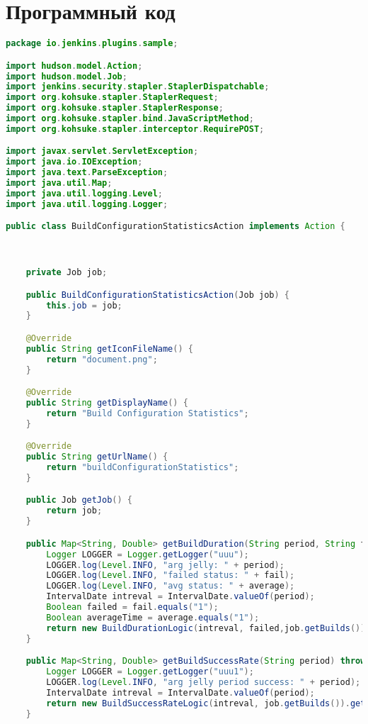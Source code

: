 \chapter{Программный код}\label{appendix-extra-examples}

\begin{lstlisting}[language=Java]
package io.jenkins.plugins.sample;

import hudson.model.Action;
import hudson.model.Job;
import jenkins.security.stapler.StaplerDispatchable;
import org.kohsuke.stapler.StaplerRequest;
import org.kohsuke.stapler.StaplerResponse;
import org.kohsuke.stapler.bind.JavaScriptMethod;
import org.kohsuke.stapler.interceptor.RequirePOST;

import javax.servlet.ServletException;
import java.io.IOException;
import java.text.ParseException;
import java.util.Map;
import java.util.logging.Level;
import java.util.logging.Logger;

public class BuildConfigurationStatisticsAction implements Action {



    private Job job;

    public BuildConfigurationStatisticsAction(Job job) {
        this.job = job;
    }

    @Override
    public String getIconFileName() {
        return "document.png";
    }

    @Override
    public String getDisplayName() {
        return "Build Configuration Statistics";
    }

    @Override
    public String getUrlName() {
        return "buildConfigurationStatistics";
    }

    public Job getJob() {
        return job;
    }

    public Map<String, Double> getBuildDuration(String period, String fail, String average) throws ParseException {
        Logger LOGGER = Logger.getLogger("uuu");
        LOGGER.log(Level.INFO, "arg jelly: " + period);
        LOGGER.log(Level.INFO, "failed status: " + fail);
        LOGGER.log(Level.INFO, "avg status: " + average);
        IntervalDate intreval = IntervalDate.valueOf(period);
        Boolean failed = fail.equals("1");
        Boolean averageTime = average.equals("1");
        return new BuildDurationLogic(intreval, failed,job.getBuilds()).getBuildsDuration(averageTime);
    }

    public Map<String, Double> getBuildSuccessRate(String period) throws ParseException {
        Logger LOGGER = Logger.getLogger("uuu1");
        LOGGER.log(Level.INFO, "arg jelly period success: " + period);
        IntervalDate intreval = IntervalDate.valueOf(period);
        return new BuildSuccessRateLogic(intreval, job.getBuilds()).getSuccessRate();
    }


\end{lstlisting}
